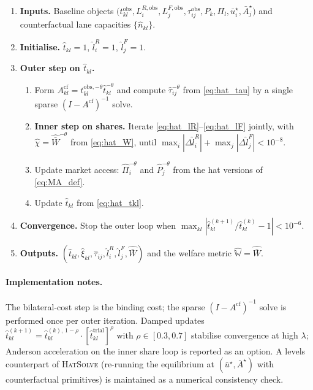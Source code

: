 \documentclass[12pt]{article}
\newcommand{\Wbar}{\bar W}
\newcommand{\ubar}{\bar u}
\newcommand{\Abar}{\bar A}
\newcommand{\tkl}{t_{kl}}
\newcommand{\tijk}{\tau_{ij}}
\newcommand{\obs}{\mathrm{obs}}
\newcommand{\cf}{\mathrm{cf}}
\begin{document}
\begin{enumerate}[leftmargin=2em,itemsep=0.2em]
\item \textbf{Inputs.} Baseline objects
  $\bigl(\tkl^{\obs},L_i^{R,\obs},L_j^{F,\obs},\tijk^{\obs},
  P_k,\Pi_l,\ubar_i^{\star},\Abar_j^{\star}\bigr)$ and counterfactual
  lane capacities $\{\hat n_{kl}\}$.
\item \textbf{Initialise.} $\hat\tkl=1$, $\hat l_i^R=1$,
  $\hat l_j^F=1$.
\item \textbf{Outer step on $\hat\tkl$.}
\begin{enumerate}[label=(\alph*),leftmargin=2em,itemsep=0.15em]
\item Form $A^{\cf}_{kl}=\tkl^{\obs,-\theta}\hat\tkl^{-\theta}$ and
  compute $\hat\tijk^{-\theta}$ from \eqref{eq:hat_tau} by a single
  sparse $(I-A^{\cf})^{-1}$ solve.
\item \textbf{Inner step on shares.} Iterate
  \eqref{eq:hat_lR}--\eqref{eq:hat_lF} jointly, with
  $\hat\chi=\hat{\Wbar}^{-\theta}$ from \eqref{eq:hat_W}, until
  $\max_i|\Delta\hat l_i^R|+\max_j|\Delta\hat l_j^F|<10^{-8}$.
\item Update market access: $\hat\Pi_i^{-\theta}$ and
  $\hat P_j^{-\theta}$ from the hat versions of \eqref{eq:MA_def}.
\item Update $\hat\tkl$ from \eqref{eq:hat_tkl}.
\end{enumerate}
\item \textbf{Convergence.} Stop the outer loop when
  $\max_{kl}|\hat\tkl^{(k+1)}/\hat\tkl^{(k)}-1|<10^{-6}$.
\item \textbf{Outputs.}
  $(\hat\tkl,\hat\xi_{kl},\hat\tijk,\hat l_i^R,\hat l_j^F,\hat{\Wbar})$
  and the welfare metric $\hat{\mathbb W}=\hat{\Wbar}$.
\end{enumerate}

\paragraph{Implementation notes.}
The bilateral-cost step is the binding cost; the sparse
$(I-A^{\cf})^{-1}$ solve is performed once per outer iteration.
Damped updates $\hat\tkl^{(k+1)}=\hat\tkl^{(k),\,1-\rho}\cdot
[\hat\tkl^{\mathrm{trial}}]^{\rho}$ with $\rho\in[0.3,0.7]$ stabilise
convergence at high $\lambda$; Anderson acceleration on the inner
share loop is reported as an option.  A levels
counterpart of \textsc{HatSolve} (re-running the equilibrium at
$(\ubar^{\star},\Abar^{\star})$ with counterfactual primitives) is
maintained as a numerical consistency check.
\end{document}
